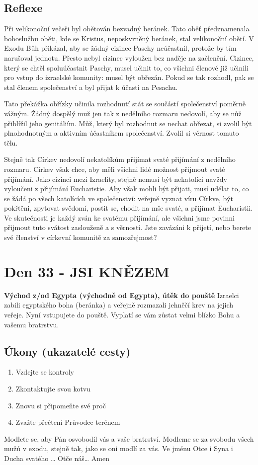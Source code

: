 \documentclass[11pt]{article}
\newcommand{\zacatekPatyTyden}{
  \textbf{Východ z/od Egypta (východně od Egypta), útěk do pouště} \newline
  Izraelci zabili egyptského boha (beránka) a veřejně rozmazali jehněčí krev na jejich veřeje. Nyní vstupujete
  do pouště. Vyplatí se vám zůstat velmi blízko Bohu a vašemu bratrstvu.

\subsection*{Úkony (ukazatelé cesty)}
\begin{enumerate}
  \item Vzdejte se kontroly
  \item Zkontaktujte svou kotvu
  \item Znovu si připomeňte své proč
  \item Zvažte přečtení Průvodce terénem
\end{enumerate}
Modlete se, aby Pán osvobodil vás a vaše bratrství. \newline
Modleme se za svobodu všech mužů v exodu, stejně tak, jako se oni modlí za vás.\newline
Ve jménu Otce i Syna i Ducha svatého …  Otče náš… Amen
}
\begin{document}
\subsection*{Reflexe}
Při velikonoční večeři byl obětován bezvadný beránek. Tato oběť předznamenala bohoslužbu oběti, kde se Kristus,
neposkvrněný beránek, stal velikonoční obětí. V Exodu Bůh přikázal, aby se žádný cizinec Paschy neúčastnil, protože
by tím narušoval jednotu. Přesto nebyl cizinec vyloužen bez naděje na začlenění. Cizinec, který se chtěl spoluúčastnit
Paschy, musel učinit to, co všichni členové již učinili pro vstup do izraelské komunity: musel být obřezán. Pokud se tak
rozhodl, pak se stal členem společenství a byl přijat k účasti na Pesachu.

Tato překážka obřízky učinila rozhodnutí stát se součástí společenství poměrně vážným. Žádný dospělý muž jen tak z
nedělního rozmaru nedovolí, aby se nůž přiblížil jeho genitáliím. Můž, který byl rozhodnut se nechat obřezat, si zvolil
být plnohodnotným a aktivním účastníkem společenství. Zvolil si věrnost tomuto tělu.

Stejně tak Církev nedovolí nekatolíkům přijímat svaté přijímání z nedělního rozmaru. Církev však chce, aby měli
všichni lidé možnost přijmout svaté přijímání. Jako cizinci mezi Izraelity, stejně nemusí být nekatolíci navždy
vyloučeni z přijímání Eucharistie. Aby však mohli být přijati, musí udělat to, co se žádá po všech katolících ve
společenství: veřejně vyznat víru Církve, být pokřtěni, zpytovat svědomí, postit se, chodit na mše svaté, a přijímat
Eucharistii. Ve skutečnosti je každý zván ke svatému přijímání, ale všichni jsme povinni přijmout tuto svátost
zaslouženě a s věrností. Jste zavázáni k přijetí, nebo berete své členství v církevní komunitě za samozřejmost?

\newpage
\section{Den 33 - JSI KNĚZEM}
\zacatekPatyTyden
\end{document}
